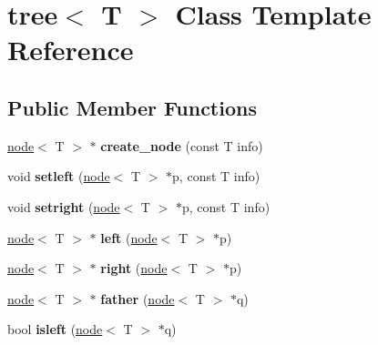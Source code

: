 \hypertarget{classtree}{\section{tree$<$ \-T $>$ \-Class \-Template \-Reference}
\label{classtree}
}
\subsection*{\-Public \-Member \-Functions}
\begin{DoxyCompactItemize}
\item 
\hypertarget{classtree_af0af3a0870746880f76526df728f977f}{\hyperlink{structnode}{node}$<$ \-T $>$ $\ast$ {\bfseries create\-\_\-node} (const \-T info)}\label{classtree_af0af3a0870746880f76526df728f977f}

\item 
\hypertarget{classtree_a927491e77d98c3ce718d78ad7d3c5a9c}{void {\bfseries setleft} (\hyperlink{structnode}{node}$<$ \-T $>$ $\ast$p, const \-T info)}\label{classtree_a927491e77d98c3ce718d78ad7d3c5a9c}

\item 
\hypertarget{classtree_abad2435e84cdfaf718ce727ccd6426fe}{void {\bfseries setright} (\hyperlink{structnode}{node}$<$ \-T $>$ $\ast$p, const \-T info)}\label{classtree_abad2435e84cdfaf718ce727ccd6426fe}

\item 
\hypertarget{classtree_a94ce1e8bae3e324b7fb1340eb6e92184}{\hyperlink{structnode}{node}$<$ \-T $>$ $\ast$ {\bfseries left} (\hyperlink{structnode}{node}$<$ \-T $>$ $\ast$p)}\label{classtree_a94ce1e8bae3e324b7fb1340eb6e92184}

\item 
\hypertarget{classtree_ada9deffa3640d27e6a94624dd6421460}{\hyperlink{structnode}{node}$<$ \-T $>$ $\ast$ {\bfseries right} (\hyperlink{structnode}{node}$<$ \-T $>$ $\ast$p)}\label{classtree_ada9deffa3640d27e6a94624dd6421460}

\item 
\hypertarget{classtree_afc4dcf300ae1552992ad96e1d6bffdcf}{\hyperlink{structnode}{node}$<$ \-T $>$ $\ast$ {\bfseries father} (\hyperlink{structnode}{node}$<$ \-T $>$ $\ast$q)}\label{classtree_afc4dcf300ae1552992ad96e1d6bffdcf}

\item 
\hypertarget{classtree_ace5d96c20570b1ba874974787e97b313}{bool {\bfseries isleft} (\hyperlink{structnode}{node}$<$ \-T $>$ $\ast$q)}\label{classtree_ace5d96c20570b1ba874974787e97b313}


\end{DoxyCompactItemize}
